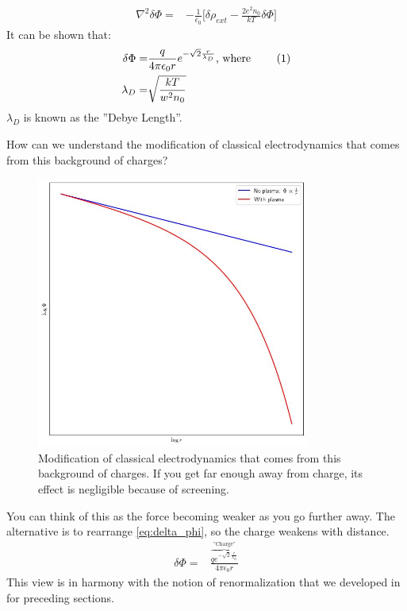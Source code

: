 \documentclass[]{article}
\newcommand\numberthis{\addtocounter{equation}{1}\tag{\theequation}}
\begin{document}
\begin{align*}
	\nabla^2 \delta \Phi =& - \frac{1}{\epsilon_0} \big[\delta \rho_{ext} - \frac{2 e^2 n_0}{kT} \delta \Phi\big]
\end{align*}
It can be shown that:
\begin{align*}
	\delta \Phi =& \frac{q}{4 \pi \epsilon_0 r} e^{- \sqrt{2} \frac{r}{\lambda_D}}\text{, where } \numberthis \label{eq:delta_phi}\\
	\lambda_D =& \sqrt{\frac{kT}{w^2 n_0}}
\end{align*}
$\lambda_D$ is known as the ''Debye Length''.

How can we understand the modification of classical electrodynamics that comes from this background of charges?

\begin{figure}[H]
	\begin{center}
		\caption[Effect of background of charge]{Modification of classical electrodynamics that comes from this background of charges. If you get far enough away from charge, its effect is negligible because of screening.}
		\includegraphics[width=0.8\textwidth]{log-plot}
	\end{center}
\end{figure}

You can think of this as the force becoming weaker as you go further away. The alternative is to rearrange \eqref{eq:delta_phi}, so the charge weakens with distance.
\begin{align*}
	\delta \Phi =& \frac{\overbrace{q e^{- \sqrt{2} \frac{r}{\lambda_D}}}^\text{''Charge''}}{4 \pi \epsilon_0 r} 
\end{align*}
This view is in harmony with the notion of renormalization that we developed in for preceding sections.
\end{document}
